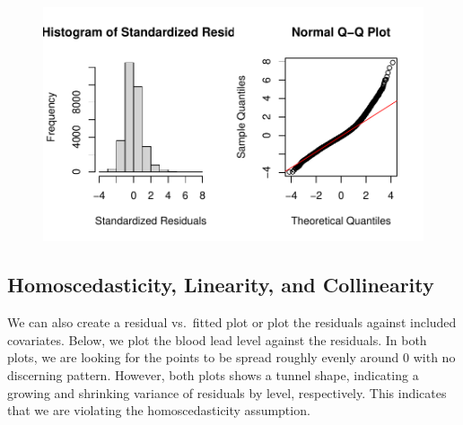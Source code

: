 \documentclass[
  letterpaper,
]{krantz}
\makeatletter
\newenvironment{Shaded}{\begin{snugshade}}{\end{snugshade}}
\newcommand{\AttributeTok}[1]{\textcolor[rgb]{0.40,0.45,0.13}{#1}}
\newcommand{\DecValTok}[1]{\textcolor[rgb]{0.68,0.00,0.00}{#1}}
\newcommand{\FunctionTok}[1]{\textcolor[rgb]{0.28,0.35,0.67}{#1}}
\newcommand{\NormalTok}[1]{\textcolor[rgb]{0.00,0.23,0.31}{#1}}
\newcommand{\SpecialCharTok}[1]{\textcolor[rgb]{0.37,0.37,0.37}{#1}}
\newcommand{\StringTok}[1]{\textcolor[rgb]{0.13,0.47,0.30}{#1}}
\newenvironment{kframe}{%
\medskip{}
\setlength{\fboxsep}{.8em}
 \def\at@end@of@kframe{}%
 \ifinner\ifhmode%
  \def\at@end@of@kframe{\end{minipage}}%
  \begin{minipage}{\columnwidth}%
 \fi\fi%
 \def\FrameCommand##1{\hskip\@totalleftmargin \hskip-\fboxsep
 \colorbox{shadecolor}{##1}\hskip-\fboxsep
     \hskip-\linewidth \hskip-\@totalleftmargin \hskip\columnwidth}%
 \MakeFramed {\advance\hsize-\width
   \@totalleftmargin\z@ \linewidth\hsize
   \@setminipage}}%
 {\par\unskip\endMakeFramed%
 \at@end@of@kframe}
\renewenvironment{Shaded}{\begin{kframe}}{\end{kframe}}
\makeatother
\begin{document}
\begin{figure}[H]

{\centering \includegraphics[width=1\textwidth,height=\textheight]{book/10_linear_regression_files/figure-pdf/unnamed-chunk-18-1.pdf}

}

\end{figure}

\hypertarget{homoscedasticity-linearity-and-collinearity}{%
\subsection{Homoscedasticity, Linearity, and
Collinearity}\label{homoscedasticity-linearity-and-collinearity}}

We can also create a residual vs.~fitted plot or plot the residuals
against included covariates. Below, we plot the blood lead level against
the residuals. In both plots, we are looking for the points to be spread
roughly evenly around 0 with no discerning pattern. However, both plots
shows a tunnel shape, indicating a growing and shrinking variance of
residuals by level, respectively. This indicates that we are violating
the homoscedasticity assumption.

\begin{Shaded}
\end{Shaded}
\end{document}

